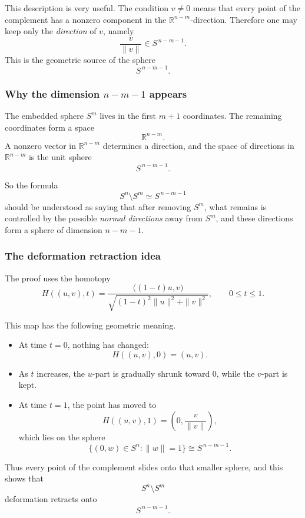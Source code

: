 \documentclass[12pt,a4paper]{article}
\theoremstyle{notespace}
\begin{document}
This description is very useful. The condition \(v\neq 0\) means that every point of the complement has a nonzero component in the \(\mathbb{R}^{n-m}\)-direction. Therefore one may keep only the \emph{direction} of \(v\), namely
\[
\frac{v}{\|v\|}\in S^{\,n-m-1}.
\]
This is the geometric source of the sphere
\[
S^{\,n-m-1}.
\]

\subsubsection{Why the dimension \(n-m-1\) appears}

The embedded sphere \(S^m\) lives in the first \(m+1\) coordinates. The remaining coordinates form a space
\[
\mathbb{R}^{n-m}.
\]
A nonzero vector in \(\mathbb{R}^{n-m}\) determines a direction, and the space of directions in \(\mathbb{R}^{n-m}\) is the unit sphere
\[
S^{\,n-m-1}.
\]

So the formula
\[
S^n\setminus S^m \simeq S^{\,n-m-1}
\]
should be understood as saying that after removing \(S^m\), what remains is controlled by the possible \emph{normal directions} away from \(S^m\), and these directions form a sphere of dimension \(n-m-1\).

\subsubsection{The deformation retraction idea}

The proof uses the homotopy
\[
H((u,v),t)
=
\frac{\bigl((1-t)u,v\bigr)}
{\sqrt{(1-t)^2\|u\|^2+\|v\|^2}},
\qquad
0\leq t\leq 1.
\]

This map has the following geometric meaning.

\begin{itemize}
	\item At time \(t=0\), nothing has changed:
	\[
	H((u,v),0)=(u,v).
	\]
	
	\item As \(t\) increases, the \(u\)-part is gradually shrunk toward \(0\), while the \(v\)-part is kept.
	
	\item At time \(t=1\), the point has moved to
	\[
	H((u,v),1)=\left(0,\frac{v}{\|v\|}\right),
	\]
	which lies on the sphere
	\[
	\{(0,w)\in S^n : \|w\|=1\}\cong S^{\,n-m-1}.
	\]
\end{itemize}

Thus every point of the complement slides onto that smaller sphere, and this shows that
\[
S^n\setminus S^m
\]
deformation retracts onto
\[
S^{\,n-m-1}.
\]
\end{document}
